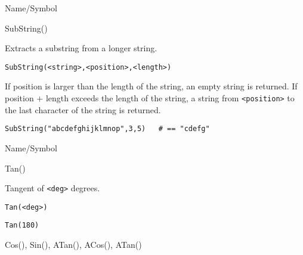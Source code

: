 \begin{desc}{Name/Symbol}
\item[Name/Symbol]  	SubString()

\item[Description]  	Extracts a substring from a longer string.

\item[Usage]
\begin{verbatim}
SubString(<string>,<position>,<length>)
\end{verbatim}
 If position is
	      	larger than the length of the string, an empty string is
	      	returned.  If position + length exceeds the length of
      	the string, a string from \verb+<position>+ to the last character of 
	the string is returned.

\item[Example]
\begin{verbatim}
SubString("abcdefghijklmnop",3,5)	# == "cdefg"
\end{verbatim}

\item[See Also]	
\end{desc}

\rl


\begin{desc}{Name/Symbol}
\item[Name/Symbol]  	Tan()	

\item[Description] 	Tangent of \verb+<deg>+ degrees.

\item[Usage]       	
\begin{verbatim}
Tan(<deg>)
\end{verbatim}

\item[Example]
\begin{verbatim}
Tan(180)
\end{verbatim}

\item[See Also]    	Cos(), Sin(), ATan(), ACos(), ATan() 
\end{desc}

\rl


